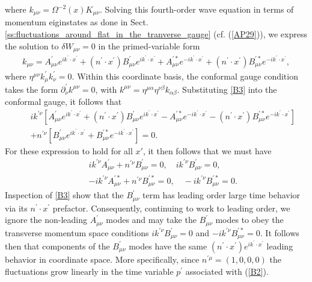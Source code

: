 %
where $k_{\mu\nu}=\Omega^{-2}(x)K_{\mu\nu}$. Solving this fourth-order wave equation in terms of momentum eiginstates as done in Sect. \ref{ss:fluctuations_around_flat_in_the_tranverse_gauge} (cf. (\ref{AP29})), we express the solution to $\delta W_{\mu\nu}=0$ in the primed-variable form
%
\begin{eqnarray}
k_{\mu\nu}=A^{\prime}_{\mu\nu}e^{ik^{\prime}\cdot x^{\prime}}+(n^{\prime}\cdot x^{\prime})B^{\prime}_{\mu\nu}e^{ik^{\prime}\cdot x^{\prime}}+A^{\prime *}_{\mu\nu}e^{-ik^{\prime}\cdot x^{\prime}}+(n^{\prime}\cdot x^{\prime})B^{\prime *}_{\mu\nu}e^{-ik^{\prime}\cdot x^{\prime}},
\label{B3}
\end{eqnarray}
%
where $\eta^{\mu\nu}k^{\prime}_{\mu}k^{\prime}_{\nu}=0$. Within this coordinate basis, the conformal gauge condition takes the form $\partial^{\prime}_{\nu}k^{\mu\nu}=0$, with $k^{\mu\nu}=\eta^{\mu\alpha}\eta^{\nu\beta}k_{\alpha\beta}$. Substituting \eqref{B3} into the conformal gauge, it follows that
%
\begin{eqnarray}
&&ik^{\prime \nu}\left[A^{\prime}_{\mu\nu}e^{ik^{\prime}\cdot x^{\prime}}+(n^{\prime}\cdot x^{\prime})B^{\prime}_{\mu\nu}e^{ik^{\prime}\cdot x^{\prime}}-A^{\prime *}_{\mu\nu}e^{-ik^{\prime}\cdot x^{\prime}}-(n^{\prime}\cdot x^{\prime})B^{\prime *}_{\mu\nu}e^{-ik^{\prime}\cdot x^{\prime}}\right]
\nonumber\\
&&+n^{\prime\nu}\left[B^{\prime}_{\mu\nu}e^{ik^{\prime}\cdot x^{\prime}}+B^{\prime *}_{\mu\nu}e^{-ik^{\prime}\cdot x^{\prime}}\right]=0.
\label{B4}
\end{eqnarray}
%
For these expression to hold for all $x'$, it then follows that we must have
%
\begin{eqnarray}
&&ik^{\prime \nu}A^{\prime}_{\mu\nu}+n^{ \prime\nu}B^{\prime}_{\mu\nu}=0,\quad ik^{\prime \nu}B^{\prime}_{\mu\nu}=0, 
\nonumber\\
&&
-ik^{\prime \nu}A^{\prime *}_{\mu\nu}+n^{ \prime\nu}B^{\prime *}_{\mu\nu}=0,\quad -ik^{\prime \nu}B^{\prime *}_{\mu\nu}=0.
\label{B5}
\end{eqnarray}
%
Inspection of \eqref{B3} show that the $B^{\prime}_{\mu\nu}$ term has leading order large time behavior via its $n^{\prime}\cdot x^{\prime}$ prefactor. Consequently, continuing to work to leading order, we ignore the non-leading $A^{\prime}_{\mu\nu}$ modes and may take the $B^{\prime}_{\mu\nu}$ modes to obey the transverse momentum space conditions $ik^{\prime \nu}B^{\prime}_{\mu\nu}=0$ and $-ik^{\prime \nu}B^{\prime *}_{\mu\nu}=0$. It follows then that components of the $B^{\prime}_{\mu\nu}$ modes have the same $(n^{\prime}\cdot x^{\prime})e^{ik^{\prime}\cdot x^{\prime}}$ leading behavior in coordinate space. More specifically, since $n^{\prime \mu}=(1,0,0,0)$ the fluctuations grow linearly in the time variable $p^{\prime}$ associated with (\ref{B2}).

